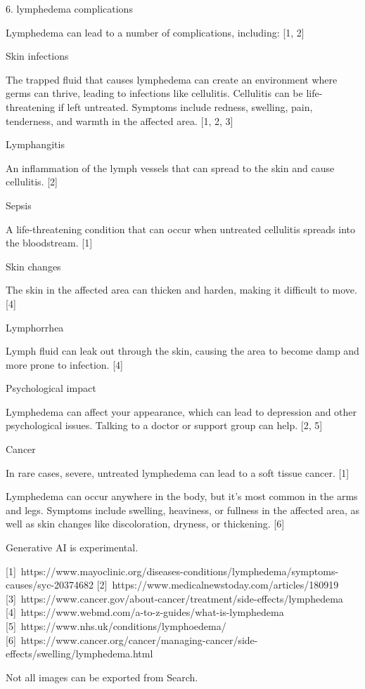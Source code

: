 6. lymphedema complications

Lymphedema can lead to a number of complications, including: [1, 2]  

Skin infections 

The trapped fluid that causes lymphedema can create an environment where germs can thrive, leading to infections like cellulitis. Cellulitis can be life-threatening if left untreated. Symptoms include redness, swelling, pain, tenderness, and warmth in the affected area. [1, 2, 3]  

Lymphangitis 

An inflammation of the lymph vessels that can spread to the skin and cause cellulitis. [2]  

Sepsis 

A life-threatening condition that can occur when untreated cellulitis spreads into the bloodstream. [1]  

Skin changes 

The skin in the affected area can thicken and harden, making it difficult to move. [4]  

Lymphorrhea 

Lymph fluid can leak out through the skin, causing the area to become damp and more prone to infection. [4]  

Psychological impact 

Lymphedema can affect your appearance, which can lead to depression and other psychological issues. Talking to a doctor or support group can help. [2, 5]  

Cancer 

In rare cases, severe, untreated lymphedema can lead to a soft tissue cancer. [1]  


Lymphedema can occur anywhere in the body, but it's most common in the arms and legs. Symptoms include swelling, heaviness, or fullness in the affected area, as well as skin changes like discoloration, dryness, or thickening. [6]  

Generative AI is experimental.

[1] https://www.mayoclinic.org/diseases-conditions/lymphedema/symptoms-causes/syc-20374682
[2] https://www.medicalnewstoday.com/articles/180919
[3] https://www.cancer.gov/about-cancer/treatment/side-effects/lymphedema
[4] https://www.webmd.com/a-to-z-guides/what-is-lymphedema
[5] https://www.nhs.uk/conditions/lymphoedema/
[6] https://www.cancer.org/cancer/managing-cancer/side-effects/swelling/lymphedema.html

Not all images can be exported from Search.

